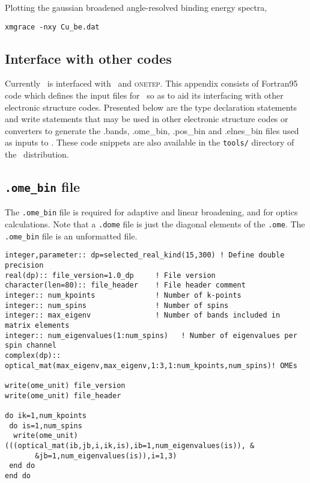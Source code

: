 \documentclass[a4paper,11pt,twoside]{book}
\begin{document}
Plotting the gaussian broadened angle-resolved binding energy spectra,

\verb#xmgrace -nxy Cu_be.dat#

\begin{appendix}

\chapter{Interface with other codes}
Currently \optados\ is interfaced with \castep\ and \textsc{onetep}.
%
This appendix consists of Fortran95 code which defines the input files for \optados\ so as to aid its interfacing with other electronic structure codes.
%
Presented below are the type declaration statements and write statements that may be used in other electronic structure codes or converters to generate the .bands, .ome\_bin, .pos\_bin and .elnes\_bin files used as inputs to \optados.
%
These code snippets are also available in the \texttt{tools/} directory of the \optados\ distribution.

\section{\texttt{.ome\_bin} file}
The \texttt{.ome\_bin} file is required for adaptive and linear broadening, and for optics calculations. 
%
Note that a \texttt{.dome} file is just the diagonal elements of the \texttt{.ome}.
%
The \texttt{.ome\_bin} file is an unformatted file.
\begin{verbatim}
integer,parameter:: dp=selected_real_kind(15,300) ! Define double precision
real(dp):: file_version=1.0_dp     ! File version
character(len=80):: file_header    ! File header comment
integer:: num_kpoints              ! Number of k-points
integer:: num_spins                ! Number of spins
integer:: max_eigenv               ! Number of bands included in matrix elements
integer:: num_eigenvalues(1:num_spins)   ! Number of eigenvalues per spin channel
complex(dp):: optical_mat(max_eigenv,max_eigenv,1:3,1:num_kpoints,num_spins)! OMEs

write(ome_unit) file_version
write(ome_unit) file_header

do ik=1,num_kpoints
 do is=1,num_spins
  write(ome_unit) (((optical_mat(ib,jb,i,ik,is),ib=1,num_eigenvalues(is)), &
       &jb=1,num_eigenvalues(is)),i=1,3)
 end do
end do
\end{verbatim}


\end{appendix}
\end{document}
